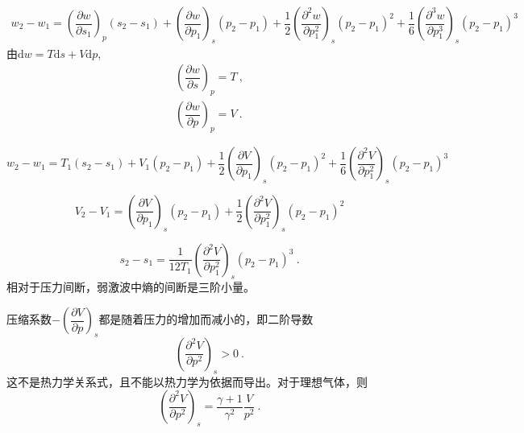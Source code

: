 \documentclass[12pt,a4paper]{article}
\newcommand{\dif}{\mathrm{d}}
\begin{document}
\begin{align*}
w_2 -w_1 = \left(\dfrac{\partial w}{\partial s_1} \right)_p (s_2-s_1) +\left(\dfrac{\partial w}{\partial p_1} \right)_s (p_2-p_1) +\dfrac{1}{2} \left(\dfrac{\partial^2 w}{\partial p_1^2} \right)_s (p_2 -p_1)^2 +\dfrac{1}{6} \left(\dfrac{\partial^3 w}{\partial p_1^3} \right)_s (p_2 -p_1)^3
\end{align*}
由$\dif w = T \dif s + V\dif p$, 
\begin{align*}
\left(\dfrac{\partial w}{\partial s} \right)_p = T ~, \\
\left(\dfrac{\partial w}{\partial p} \right)_p = V ~. 
\end{align*}

\begin{equation*}
w_2 -w_1 = T_1 (s_2 - s_1) +V_1 (p_2 - p_1) +\dfrac{1}{2} \left(\dfrac{\partial V}{\partial p_1} \right)_s (p_2 -p_1)^2 +\dfrac{1}{6} \left(\dfrac{\partial^2 V}{\partial p_1^2} \right)_s (p_2 -p_1)^3
\end{equation*}



\begin{equation*}
V_2 -V_1 = \left(\dfrac{\partial V}{\partial p_1} \right)_s (p_2 -p_1) +\dfrac{1}{2} \left(\dfrac{\partial^2 V}{\partial p_1^2} \right)_s (p_2 -p_1)^2
\end{equation*}

\begin{equation*}
s_2 -s_1 = \dfrac{1}{12 T_1}  \left(\dfrac{\partial^2 V}{\partial p_1^2} \right)_s (p_2 -p_1)^3 ~.
\end{equation*}
相对于压力间断，弱激波中熵的间断是三阶小量。


压缩系数$-\left( \dfrac{\partial V}{\partial p} \right)_s$都是随着压力的增加而减小的，即二阶导数
\begin{equation}
\left(\dfrac{\partial^2 V}{\partial p^2} \right)_s > 0 ~.
\end{equation}
这不是热力学关系式，且不能以热力学为依据而导出。对于理想气体，则
\begin{equation*}
\left(\dfrac{\partial^2 V}{\partial p^2} \right)_s = \dfrac{\gamma+1}{\gamma^2} \dfrac{V}{p^2} ~.
\end{equation*}
\end{document}
